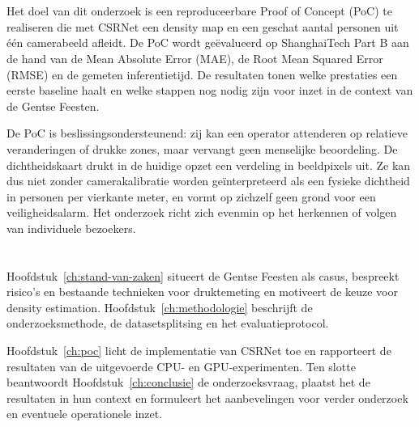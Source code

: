 \section{}%
\label{sec:onderzoeksdoelstelling}

Het doel van dit onderzoek is een reproduceerbare Proof of Concept (PoC) te realiseren die met CSRNet een density map en een geschat aantal personen uit één camerabeeld afleidt. De PoC wordt geëvalueerd op ShanghaiTech Part B aan de hand van de Mean Absolute Error (MAE), de Root Mean Squared Error (RMSE) en de gemeten inferentietijd. De resultaten tonen welke prestaties een eerste baseline haalt en welke stappen nog nodig zijn voor inzet in de context van de Gentse Feesten.

De PoC is beslissingsondersteunend: zij kan een operator attenderen op relatieve veranderingen of drukke zones, maar vervangt geen menselijke beoordeling. De dichtheidskaart drukt in de huidige opzet een verdeling in beeldpixels uit. Ze kan dus niet zonder camerakalibratie worden geïnterpreteerd als een fysieke dichtheid in personen per vierkante meter, en vormt op zichzelf geen grond voor een veiligheidsalarm. Het onderzoek richt zich evenmin op het herkennen of volgen van individuele bezoekers.

\section{}%
\label{sec:opzet-bachelorproef}

Hoofdstuk~\ref{ch:stand-van-zaken} situeert de Gentse Feesten als casus, bespreekt risico's en bestaande technieken voor druktemeting en motiveert de keuze voor density estimation. Hoofdstuk~\ref{ch:methodologie} beschrijft de onderzoeksmethode, de datasetsplitsing en het evaluatieprotocol.

Hoofdstuk~\ref{ch:poc} licht de implementatie van CSRNet toe en rapporteert de resultaten van de uitgevoerde CPU- en GPU-experimenten. Ten slotte beantwoordt Hoofdstuk~\ref{ch:conclusie} de onderzoeksvraag, plaatst het de resultaten in hun context en formuleert het aanbevelingen voor verder onderzoek en eventuele operationele inzet.
